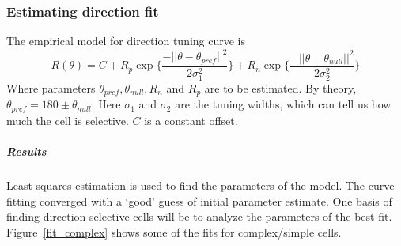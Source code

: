 \documentclass[11pt]{article}
\begin{document}

\subsubsection{Estimating direction fit} %
\label{ssub:estimating_direction_fit}
The empirical model for direction tuning curve is
$$R(\theta) = C + R_p \exp\{\frac{-||\theta-\theta_{pref}||^2}{2\sigma_1^2}\} + R_n \exp\{\frac{-||\theta-\theta_{null}||^2}{2\sigma_2^2}\}$$
Where parameters $\theta_{pref}, \theta_{null}, R_n$ and $R_p$ are to be estimated. By theory, $\theta_{pref} = 180 \pm \theta_{null}$. Here $\sigma_1$ and $\sigma_2$ are the tuning widths, which can tell us how much the cell is selective. $C$ is a constant offset.
\subparagraph{Results} %
\label{subp:results}
Least squares estimation is used to find the parameters of the model. The curve fitting converged with a `good' guess of initial parameter estimate. One basis of finding direction selective cells will be to analyze the parameters of the best fit. Figure~\ref{fit_complex} shows some of the fits for complex/simple cells.
\end{document}
